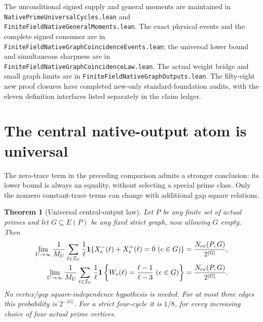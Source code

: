 \documentclass[11pt]{article}
\newtheorem{theorem}{Theorem}[section]
\begin{document}
The unconditional signed supply and general moments are maintained in
\texttt{NativePrimeUniversalCycles.lean} and
\texttt{FiniteFieldNativeGeneralMoments.lean}.
The exact physical events and the complete signed consumer are in
\texttt{FiniteFieldNativeGraphCoincidenceEvents.lean};
the universal lower bound and simultaneous sharpness are in
\texttt{FiniteFieldNativeGraphCoincidenceLaw.lean}.
The actual weight bridge and small graph limits are in
\texttt{FiniteFieldNativeGraphOutputs.lean}.
The fifty-eight new proof closures have completed new-only
standard-foundation audits, with the eleven definition interfaces
listed separately in the claim ledger.

\section{The central native-output atom is universal}
\label{sec:native-universal-zero}

The zero-trace term in the preceding comparison admits a stronger
conclusion: its lower bound is always an equality, without selecting
a special prime class. Only the nonzero constant-trace terms can change
with additional gap square relations.

\begin{theorem}[Universal central-output law]
\label{thm:native-universal-zero}
Let \(P\) be any finite set of actual primes and let
\(G\subseteq E(P)\) be any fixed strict graph, now allowing \(G\) empty.
Then
\begin{align}
 \lim_{U\to\infty}\frac1{M_U}
  \sum_{\ell\in\mathcal I_U}\frac1\ell
  \mathbf1\{X^-_e(\ell)+X^+_e(\ell)=0\ (e\in G)\}
 &=\frac{N_{\rm ev}(P,G)}{2^{|G|}},\label{eq:native-universal-zero}\\
 \lim_{U\to\infty}\frac1{M_U}
  \sum_{\ell\in\mathcal I_U}\frac1\ell
  \mathbf1\left\{W_e(\ell)=\frac{\ell-1}{\ell-3}\ (e\in G)\right\}
 &=\frac{N_{\rm ev}(P,G)}{2^{|G|}}.\label{eq:native-universal-central}
\end{align}
No vertex/gap square-independence hypothesis is needed.
For at most three edges this probability is \(2^{-|G|}\).
For a strict four-cycle it is \(1/8\), for every increasing choice
of four actual prime vertices.
\end{theorem}
\end{document}

